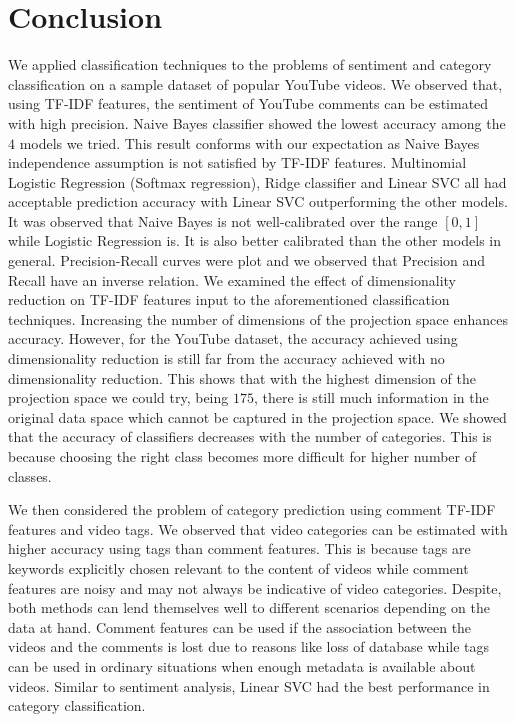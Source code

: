 \section{Conclusion}
\label{sec:conclusion}
We applied classification techniques to the problems of sentiment and category classification on a sample dataset of popular YouTube videos.
We observed that, using TF-IDF features, the sentiment of YouTube comments can be estimated with high precision. Naive Bayes classifier showed the lowest accuracy among the $4$ models we tried. This result conforms with our expectation as Naive Bayes independence assumption is not satisfied by TF-IDF features. Multinomial Logistic Regression (Softmax regression), Ridge classifier and Linear SVC all had acceptable prediction accuracy with Linear SVC outperforming the other models. It was observed that Naive Bayes is not well-calibrated over the range $[0,1]$ while Logistic Regression is. It is also better calibrated than the other models in general. Precision-Recall curves were plot and we observed that Precision and Recall have an inverse relation. We examined the effect of dimensionality reduction on TF-IDF features input to the aforementioned classification techniques. Increasing the number of dimensions of the projection space enhances accuracy. However, for the YouTube dataset, the accuracy achieved using dimensionality reduction is still far from the accuracy achieved with no dimensionality reduction. This shows that with the highest dimension of the projection space we could try, being $175$, there is still much information in the original data space which cannot be captured in the projection space. We showed that the accuracy of classifiers decreases with the number of categories. This is because choosing the right class becomes more difficult for higher number of classes.

We then considered the problem of category prediction using comment TF-IDF features and video tags. We observed that video categories can be estimated with higher accuracy using tags than comment features. This is because tags are keywords explicitly chosen relevant to the content of videos while comment features are noisy and may not always be indicative of video categories. Despite, both methods can lend themselves well to different scenarios depending on the data at hand. Comment features can be used if the association between the videos and the comments is lost due to reasons like loss of database while tags can be used in ordinary situations when enough metadata is available about videos. Similar to sentiment analysis, Linear SVC had the best performance in category classification.

 